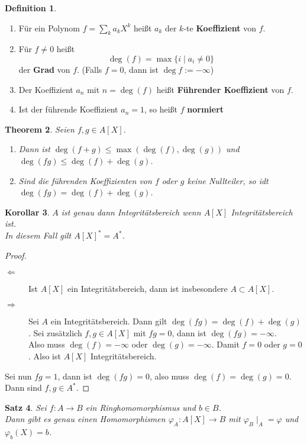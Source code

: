 \documentclass[10pt,a4paper]{article}
\theoremstyle{plain}
\newtheorem{theorem}{Theorem}[section]
\newtheorem{kor}[theorem]{Korollar}
\newtheorem{satz}[theorem]{Satz}
\theoremstyle{definition}
\newtheorem{definition}[theorem]{Definition}
\theoremstyle{remark}
\begin{document}
	\begin{definition}
		\begin{enumerate}
			\item Für ein Polynom $f=\sum_ka_kX^k$ heißt $a_k$ der $k$-te \textbf{Koeffizient} von $f$.
			\item Für $f\neq0$ heißt
			\[\deg(f)=\max\{i\mid a_i\neq 0\}\]
			der \textbf{Grad} von $f$. (Falls $f=0$, dann ist $\deg f:=-\infty$)
			\item Der Koeffizient $a_n$ mit $n=\deg(f)$ heißt \textbf{Führender Koeffizient} von $f$.
			\item Ist der führende Koeffizient $a_n=1$, so heißt $f$ \textbf{normiert}
		\end{enumerate}
	\end{definition}

	\begin{theorem}
		Seien $f,g\in A[X]$. \begin{enumerate}
			\item Dann ist $\deg(f+g)\leq\max(\deg (f),\deg (g))$ und $\deg(fg)\leq\deg(f)+\deg(g)$.\\
			\item Sind die führenden Koeffizienten von $f$ oder $g$ keine Nullteiler, so idt $\deg(fg)=\deg(f)+\deg (g)$.
		\end{enumerate}
	\end{theorem}

	\begin{kor}
		$A$ ist genau dann Integritätsbereich wenn $A[X]$ Integritätsbereich ist.\\
		In diesem Fall gilt $A[X]^*=A^*$.
	\end{kor}
	\begin{proof}
		\begin{description}
			\item[$\Leftarrow$] Ist $A[X]$ ein Integritätsbereich, dann ist insbesondere $A\subset A[X]$.
			\item[$\Rightarrow$] Sei $A$ ein Integritätsbereich. Dann gilt $\deg(fg)=\deg(f)+\deg(g)$. Sei zusätzlich $f,g\in A[X]$ mit $fg=0$, dann ist $\deg(fg)=-\infty$.\\
			Also muss $\deg(f)=-\infty$ oder $\deg(g)=-\infty$. Damit $f=0$ oder $g=0$. Also ist $A[X]$ Integritätsbereich.
		\end{description}
		Sei nun $fg=1$, dann ist $\deg(fg)=0$, also muss $\deg(f)=\deg(g)=0$. Dann sind $f,g\in A^*$.
	\end{proof}

	\begin{satz}
		Sei $f:A\to B$ ein Ringhomomorphismus und $b\in B$. \\
		Dann gibt es genau einen Homomorphismen $\varphi_A:A[X]\to B$ mit $\varphi_B\mid_A=\varphi$ und $\varphi_b(X)=b$.
	\end{satz}
\end{document}
